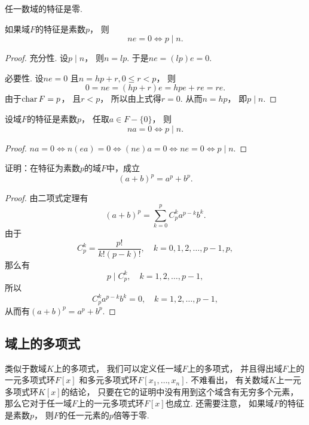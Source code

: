 任一数域的特征是零.

\begin{corollary}
如果域\(F\)的特征是素数\(p\)，
则\[
	ne=0
	\iff
	p \mid n.
\]
\begin{proof}
充分性.
设\(p \mid n\)，
则\(n=lp\).
于是\(ne
=(lp)e
=0\).

必要性.
设\(ne=0\)
且\(n=hp+r,0\leq r<p\)，
则\[
	0=ne
	=(hp+r)e
	=hpe+re
	=re.
\]
由于\(\operatorname{char} F=p\)，
且\(r<p\)，
所以由上式得\(r=0\).
从而\(n=hp\)，
即\(p \mid n\).
\end{proof}
\end{corollary}

\begin{corollary}
设域\(F\)的特征是素数\(p\)，
任取\(a \in F-\{0\}\)，
则\[
	na=0
	\iff
	p \mid n.
\]
\begin{proof}
\(na=0
\iff
n(ea)=0
\iff
(ne)a=0
\iff
ne=0
\iff
p \mid n\).
\end{proof}
\end{corollary}

\begin{example}\label{example:域.域上的特征恒等式}
证明：在特征为素数\(p\)的域\(F\)中，成立\begin{equation*}
	(a+b)^p = a^p + b^p.
\end{equation*}
\begin{proof}
由二项式定理有\begin{equation*}
	(a+b)^p
	= \sum_{k=0}^p C_p^k a^{p-k} b^k.
\end{equation*}
由于\begin{equation*}
	C_p^k = \frac{p!}{k!(p-k)!},
	\quad k=0,1,2,\dotsc,p-1,p,
\end{equation*}
那么有\begin{equation*}
	p \mid C_p^k,
	\quad k=1,2,\dotsc,p-1,
\end{equation*}
所以\begin{equation*}
	C_p^k a^{p-k} b^k = 0,
	\quad k=1,2,\dotsc,p-1,
\end{equation*}
从而有\((a+b)^p = a^p + b^p\).
\end{proof}
\end{example}

\subsection{域上的多项式}
类似于数域\(K\)上的多项式，
我们可以定义任一域\(F\)上的多项式，
并且得出域\(F\)上的一元多项式环\(F[x]\)
和多元多项式环\(F[x_1,\dotsc,x_n]\).
不难看出，
有关数域\(K\)上一元多项式环\(K[x]\)的结论，
只要在它的证明中没有用到这个域含有无穷多个元素，
那么它对于任一域\(F\)上的一元多项式环\(F[x]\)也成立.
还需要注意，
如果域\(F\)的特征是素数\(p\)，
则\(F\)的任一元素的\(p\)倍等于零.

